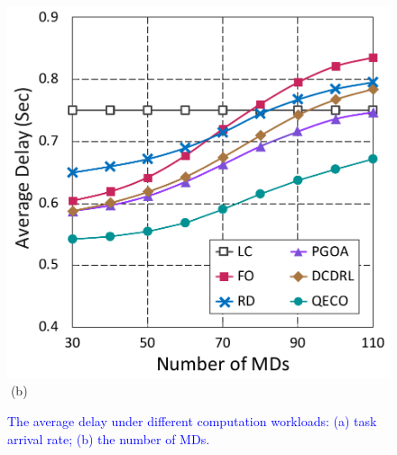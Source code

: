 \documentclass[10pt, journal,letterpaper]{IEEEtran}
\begin{document}
\begin{figure}[t]
\begin{minipage}[b]{0.50\linewidth}
	\includegraphics[width=\textwidth]{ delay_2}
	\textcolor{white}{i}\hspace{0.6cm}(b)
\end{minipage}
\vspace{-0.7cm}
\caption{\textcolor{blue}{The average delay under different computation workloads: (a) task arrival rate; (b) the number of MDs.}}
\label{chart3}
\end{figure} 
\end{document}
